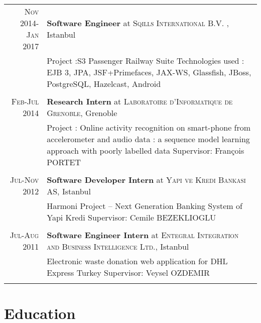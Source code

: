 \documentclass[a4paper,10pt]{article} %
\begin{document}
\begin{tabular}{r|p{13cm}}
\textsc{Nov 2014-Jan 2017} & \textbf{Software Engineer} at \textsc{Sqills International B.V. }, Istanbul \emph{}\\
& \footnotesize{Project :S3 Passenger Railway Suite
\newline
Technologies used : EJB 3, JPA, JSF+Primefaces, JAX-WS, Glassfish, JBoss, PostgreSQL, Hazelcast, Android
}\\
\multicolumn{2}{c}{} \\


\textsc{Feb-Jul 2014} & \textbf{Research Intern} at \textsc{Laboratoire d'Informatique de Grenoble}, Grenoble \emph{}\\
& \footnotesize{Project : Online activity recognition on smart-phone from accelerometer and audio data : a sequence model learning approach with poorly labelled data
\newline
Supervisor: François PORTET
}\\
\multicolumn{2}{c}{} \\


\textsc{Jul-Nov 2012} & \textbf{Software Developer Intern} at \textsc{Yapi ve Kredi Bankası AS}, Istanbul \emph{}\\
& \footnotesize{Harmoni Project – Next Generation Banking  System of Yapi Kredi
\newline
Supervisor: Cemile BEZEKLIOGLU
}\\
\multicolumn{2}{c}{} \\


\textsc{Jul-Aug 2011} & \textbf{Software Engineer Intern} at \textsc{Entegral Integration and Business Intelligence Ltd.}, Istanbul \emph{}\\
& \footnotesize{Electronic waste donation web application for DHL Express Turkey
\newline
Supervisor: Veysel OZDEMIR
}\\
\multicolumn{2}{c}{} \\

\end{tabular}


\section{Education}
\end{document}
